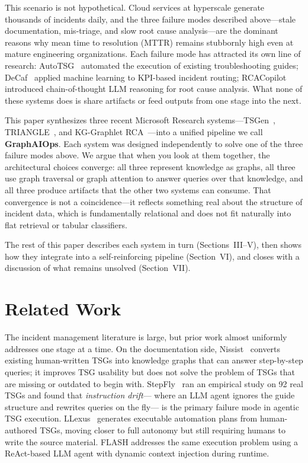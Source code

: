 \documentclass[conference]{IEEEtran}
\begin{document}
This scenario is not hypothetical. Cloud services at hyperscale generate thousands
of incidents daily, and the three failure modes described above---stale documentation,
mis-triage, and slow root cause analysis---are the dominant reasons why mean time
to resolution (MTTR) remains stubbornly high even at mature engineering organizations.
Each failure mode has attracted its own line of research: AutoTSG~\cite{autotsq}
automated the execution of existing troubleshooting guides; DeCaf~\cite{decaf}
applied machine learning to KPI-based incident routing; RCACopilot~\cite{rcacopilot}
introduced chain-of-thought LLM reasoning for root cause analysis.
What none of these systems does is share artifacts or feed outputs from one stage
into the next.

This paper synthesizes three recent Microsoft Research systems---TSGen~\cite{tsgen},
TRIANGLE~\cite{triangle}, and KG-Graphlet RCA~\cite{ckg}---into a unified pipeline
we call \textbf{GraphAIOps}. Each system was designed independently to solve one
of the three failure modes above. We argue that when you look at them together,
the architectural choices converge: all three represent knowledge as graphs,
all three use graph traversal or graph attention to answer queries over that
knowledge, and all three produce artifacts that the other two systems can consume.
That convergence is not a coincidence---it reflects something real about the
structure of incident data, which is fundamentally relational and does not fit
naturally into flat retrieval or tabular classifiers.

The rest of this paper describes each system in turn (Sections~III--V),
then shows how they integrate into a self-reinforcing pipeline (Section~VI),
and closes with a discussion of what remains unsolved (Section~VII).


\section{Related Work}

The incident management literature is large, but prior work almost uniformly
addresses one stage at a time. On the documentation side, Nissist~\cite{nissist}
converts existing human-written TSGs into knowledge graphs that can answer
step-by-step queries; it improves TSG usability but does not solve the problem
of TSGs that are missing or outdated to begin with. StepFly~\cite{stepfly} ran
an empirical study on 92 real TSGs and found that \textit{instruction drift}---
where an LLM agent ignores the guide structure and rewrites queries on the fly---
is the primary failure mode in agentic TSG execution. LLexus~\cite{llexus}
generates executable automation plans from human-authored TSGs, moving closer to
full autonomy but still requiring humans to write the source material. FLASH
addresses the same execution problem using a ReAct-based LLM agent with dynamic
context injection during runtime.
\end{document}
